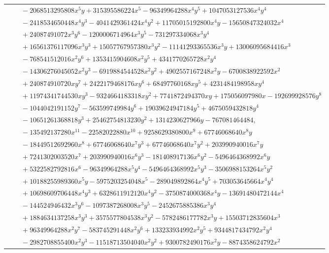 \documentclass[11pt]{article}
\begin{document}
\begin{longtable}{@{}ll@{}}
 & $\quad -2068513295808x^{5}y+315395586224x^{5}-96349964288x^{4}y^{5}+1047053127536x^{4}y^{4}$\\
 & $\quad -2418534650448x^{4}y^{3}-4041429361424x^{4}y^{2}+11705015192800x^{4}y-15650847324032x^{4}$\\
 & $\quad +24087491072x^{3}y^{6}-1200006714964x^{3}y^{5}-731297334068x^{3}y^{4}$\\
 & $\quad +16561376117096x^{3}y^{3}+15057767957380x^{3}y^{2}-11141293365536x^{3}y+13006095684416x^{3}$\\
 & $\quad -768541512016x^{2}y^{6}+1353415904608x^{2}y^{5}+4341770265728x^{2}y^{4}$\\
 & $\quad -14306276045052x^{2}y^{3}-6919884544528x^{2}y^{2}+4902557167248x^{2}y-6700838922592x^{2}$\\
 & $\quad +240874910720xy^{7}+2422179468176xy^{6}+68497760168xy^{5}+4231484198958xy^{4}$\\
 & $\quad +11974341744530xy^{3}-9324664183318xy^{2}+7741872494370xy+175056097980x-192699928576y^{8}$\\
 & $\quad -1044042191152y^{7}-563599749984y^{6}+19039624947184y^{5}+4675059432818y^{4}$\\
 & $\quad -10651261368818y^{3}+25462754813230y^{2}+1314230627966y-767081464484,$\\
 & $\quad -135492137280x^{11}-22582022880x^{10}+9258629380800x^{9}+67746068640x^{8}y$\\
 & $\quad -18449512692960x^{8}+67746068640x^{7}y^{3}+67746068640x^{7}y^{2}+203990940016x^{7}y$\\
 & $\quad +7241302003520x^{7}+203990940016x^{6}y^{3}-181408917136x^{6}y^{2}-5496464368992x^{6}y$\\
 & $\quad +5322582792816x^{6}-96349964288x^{5}y^{4}-5496464368992x^{5}y^{3}-3506988153264x^{5}y^{2}$\\
 & $\quad +10188255989360x^{5}y-5975203254048x^{5}-289049892864x^{4}y^{5}+703053645664x^{4}y^{4}$\\
 & $\quad +10698609706448x^{4}y^{3}+6328611912120x^{4}y^{2}-3750874000368x^{4}y-13691480472144x^{4}$\\
 & $\quad -144524946432x^{3}y^{6}-1097387268008x^{3}y^{5}-2452675885386x^{3}y^{4}$\\
 & $\quad +1884634137258x^{3}y^{3}+3575577804538x^{3}y^{2}-5782486177782x^{3}y+15503712835604x^{3}$\\
 & $\quad +96349964288x^{2}y^{7}-583745291448x^{2}y^{6}+133233934992x^{2}y^{5}+9344817434792x^{2}y^{4}$\\
 & $\quad -2982708855400x^{2}y^{3}-11518713504040x^{2}y^{2}+9300782490176x^{2}y-8874358624792x^{2}$\\

\end{longtable}
\end{document}
